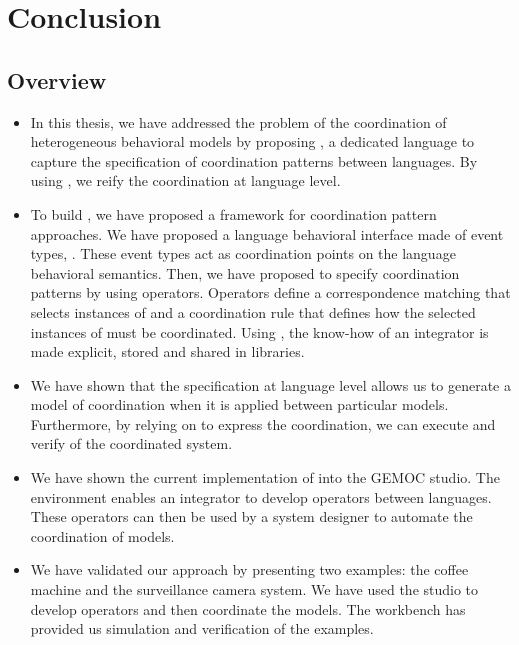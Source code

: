 \chapter{Conclusion}
\label{ch:conclusions}

\section{Overview}

\begin{itemize}
		
	\item In this thesis, we have addressed the problem of the coordination of heterogeneous behavioral models by proposing \bcool, a dedicated language to capture the specification of coordination patterns between languages. By using \bcool, we reify the coordination at language level.
	
	\item To build \bcool, we have proposed a framework for coordination pattern approaches. We have proposed a language behavioral interface made of event types, \ie \dse. These event types act as coordination points on the language behavioral semantics. Then, we have proposed to specify coordination patterns by using operators. Operators define a correspondence matching that selects instances of \dse and a coordination rule that defines how the selected instances of \dse must be coordinated. Using \bcool, the know-how of an integrator is made explicit, stored and shared in libraries.

	\item We have shown that the specification at language level allows us to generate a model of coordination when it is applied between particular models. Furthermore, by relying on \ccsl to express the coordination, we can execute and verify of the coordinated system.   
	
	\item We have shown the current implementation of \bcool into the GEMOC studio. The environment enables an integrator to develop operators between languages. These operators can then be used by a system designer to automate the coordination of models. 
	
	\item We have validated our approach by presenting two examples: the coffee machine and the surveillance camera system. We have used the studio to develop operators and then coordinate the models. The workbench has provided us simulation and verification of the examples. 
	  

\end{itemize}
